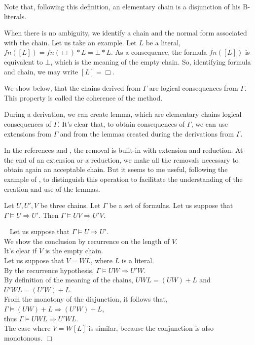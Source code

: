 \documentclass{article}
\newenvironment{preuve}{\noindent {\em Proof :}\ }{{\hfill
    $\Box$}\vspace{.5pc}} \newcommand{\sg}{\!\!<\!\!}
\begin{document}
Note that, following this definition, an elementary chain is a disjunction of his B-literals.

When there is no ambiguity, we identify a chain and the normal form associated with the chain. Let us take an example.
Let $L$ be a literal, $fn([L])=fn(\Box)*L = \bot * L$. As a consequence, the formula $fn([L])$ is equivalent to $\bot$, 
which is the meaning of the empty chain. So, identifying formula and chain, we may write $[L]=\Box$.

We show below, that the chains derived from $\Gamma$ are logical consequences from $\Gamma$. This property is called the 
coherence of the method.

During a derivation, we can create lemma, which are elementary chains logical consequences of $\Gamma$.
It's clear that, to obtain consequences of $\Gamma$, we can use extensions from $\Gamma$ and from the lemmas created during
the derivations from $\Gamma$.

In the references \cite{Loveland1997} and \cite{Loveland1978}, the removal is built-in with extension and reduction.
At the end of an extension or a reduction, we make all the removals necessary to obtain again an acceptable chain. 
But it seems to me useful, following the example of \cite{CSC648}, to distinguish this operation to facilitate the 
understanding of the creation and use of the lemmas.


\begin{lemme}\label{monotonie-chaine}
Let $U,U',V$ be three chains. Let $\Gamma$ be a set of formulas.
Let us suppose that 
 $\Gamma \models U \Rightarrow U'$. Then $\Gamma \models UV \Rightarrow U'V$. 
\end{lemme}

\begin{preuve}
Let us suppose that $\Gamma \models U \Rightarrow U'$. \\
We show the conclusion by recurrence on the length of $V$. \\
It's clear if $V$ is the empty chain.\\
Let us suppose that $V=WL$, where $L$ is a literal.\\
By the recurrence hypothesis,  $\Gamma \models UW \Rightarrow U'W$.\\
By definition of the meaning of the chains, $UWL = (UW)+L$ and $U'WL = (U'W)+L$.\\
From the monotony of the disjunction, it follows that, $\Gamma \models (UW)+L \Rightarrow (U'W)+L$, \\thus 
$\Gamma \models UWL \Rightarrow U'WL$.\\
The case where $V=W[L]$ is similar, because the conjunction is also monotonous.
\end{preuve}
\end{document}
